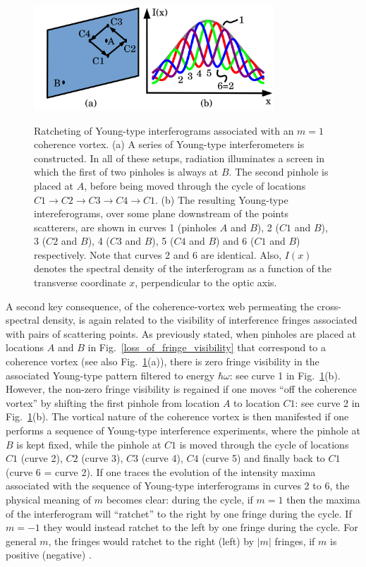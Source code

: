 \documentclass{iucr}              %
\begin{document}
\begin{figure}
\caption{Ratcheting of Young-type interferograms associated with an $m=1$ coherence vortex.  (a) A series of Young-type interferometers is constructed.  In all of these setups, radiation illuminates a screen in which the first of two pinholes is always at $B$.  The second pinhole is placed at $A$, before being moved through the cycle of locations $C1 \rightarrow C2 \rightarrow C3 \rightarrow C4 \rightarrow C1$.  (b) The resulting Young-type intereferograms, over some plane downstream of the points scatterers, are shown in curves 1 (pinholes $A$ and $B$), 2 ($C1$ and $B$), 3 ($C2$ and $B$), 4 ($C3$ and $B$), 5 ($C4$ and $B$) and 6 ($C1$ and $B$) respectively. Note that curves 2 and 6 are identical.  Also, $I(x)$ denotes the spectral density of the interferogram as a function of the transverse coordinate $x$, perpendicular to the optic axis.}
\includegraphics[width=9.0cm]{Figures/Anholonomy.png}
\label{Young_fringe_anholonomy}
\end{figure}

A second key consequence, of the coherence-vortex web permeating the cross-spectral density, is again related to the visibility of interference fringes associated with pairs of scattering points.  As previously stated, when pinholes are placed at locations $A$ and $B$ in Fig.~\ref{loss_of_fringe_visibility} that correspond to a coherence vortex (see also Fig.~\ref{Young_fringe_anholonomy}(a)), there is zero fringe visibility in the associated Young-type pattern filtered to energy $\hbar \omega$: see curve 1 in Fig.~\ref{Young_fringe_anholonomy}(b).  However, the non-zero fringe visibility is regained if one moves ``off the coherence vortex'' by shifting the first pinhole from location $A$ to location $C1$: see curve 2 in Fig.~\ref{Young_fringe_anholonomy}(b).  The vortical nature of the coherence vortex is then manifested if one performs a sequence of Young-type interference experiments, where the pinhole at $B$ is kept fixed, while the pinhole at $C1$ is moved through the cycle of locations $C1$ (curve 2), $C2$ (curve 3), $C3$ (curve 4), $C4$ (curve 5) and finally back to $C1$ (curve 6 = curve 2). If one traces the evolution of the intensity maxima associated with the sequence of Young-type interferograms in curves 2 to 6, the physical meaning of $m$ becomes clear: during the cycle, if $m=1$ then the maxima of the interferogram will ``ratchet'' to the right by one fringe during the cycle. If $m=-1$ they would instead ratchet to the left by one fringe during the cycle.  For general $m$, the fringes would ratchet to the right (left) by $|m|$ fringes, if $m$ is positive (negative) \cite{Marasinghe2010}.
\end{document}
